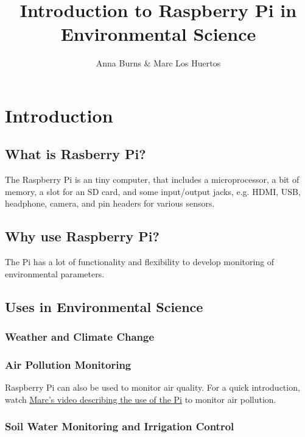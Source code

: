 \documentclass{article}\usepackage[]{graphicx}\usepackage[]{color}
\author{Anna Burns \& Marc Los Huertos}
\title{Introduction to Raspberry Pi in Environmental Science}
\begin{document}
\maketitle


\newpage

\section{Introduction}

\subsection{What is Rasberry Pi?}

The Raspberry Pi is an tiny computer, that includes a microprocessor, a bit of memory, a slot for an SD card, and some input/output jacks, e.g. HDMI, USB, headphone, camera, and pin headers for various sensors.

\subsection{Why use Raspberry Pi?}

The Pi has a lot of functionality and flexibility to develop monitoring of environmental parameters. 

\subsection{Uses in Environmental Science}

\subsubsection{Weather and Climate Change}

\subsubsection{Air Pollution Monitoring}

Raspberry Pi can also be used to monitor air quality. For a quick introduction, watch \href{https://use.vg/hDDhGdtnuhPT}{Marc's video describing the use of the Pi} to monitor air pollution. 

\subsubsection{Soil Water Monitoring and Irrigation Control}
\end{document}
